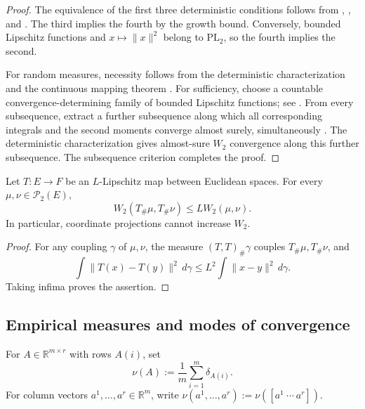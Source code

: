\begin{proof}
The equivalence of the first three deterministic conditions follows from
\cite[Definition~6.8 and Theorem~6.9]{villani2009optimal},
\cite[Proposition~7.1.5]{ambrosio2008gradientflows}, and
\cite[Theorem~5.11]{santambrogio2015optimal}.
The third implies the fourth by the growth bound. Conversely,
bounded Lipschitz functions and $x\mapsto\|x\|^2$ belong to
$\mathrm{PL}_2$, so the fourth implies the second.

For random measures, necessity follows from the deterministic
characterization and the continuous mapping theorem
\cite[Lemma~5.3]{kallenberg2021foundations}.
For sufficiency, choose a countable convergence-determining family
of bounded Lipschitz functions; see
\cite[Proposition~2.2]{wormhille2009ergodic}.
From every subsequence, extract a further subsequence along which
all corresponding integrals and the second moments converge
almost surely, simultaneously
\cite[Lemmas~5.2 and~5.4]{kallenberg2021foundations}.
The deterministic characterization gives almost-sure $W_2$ convergence
along this further subsequence. The subsequence criterion
\cite[Lemma~5.2]{kallenberg2021foundations} completes the proof.
\end{proof}

\begin{lemma}
\label{lemma:wasserstein-lipschitz-pushforward}
Let $T:E\to F$ be an $L$-Lipschitz map between Euclidean spaces.
For every $\mu,\nu\in\mathscr P_2(E)$,
\[
    W_2(T_\#\mu,T_\#\nu)\leq L W_2(\mu,\nu).
\]
In particular, coordinate projections cannot increase $W_2$.
\end{lemma}

\begin{proof}
For any coupling $\gamma$ of $\mu,\nu$, the measure
$(T,T)_\#\gamma$ couples $T_\#\mu,T_\#\nu$, and
\[
    \int\|T(x)-T(y)\|^2\,d\gamma
    \leq L^2\int\|x-y\|^2\,d\gamma.
\]
Taking infima proves the assertion.
\end{proof}

\subsection{Empirical measures and modes of convergence}
\label{subsec:empirical-measures}

\begin{definition}
\label{definition:empirical-measures}
For $A\in\mathbb R^{m\times r}$ with rows $A(i)$, set
\[
  \nu(A):=\frac1m\sum_{i=1}^m\delta_{A(i)}.
\]
For column vectors $a^1,\ldots,a^r\in\mathbb R^m$, write
$\nu(a^1,\ldots,a^r):=\nu([a^1\ \cdots\ a^r])$.
\end{definition}

